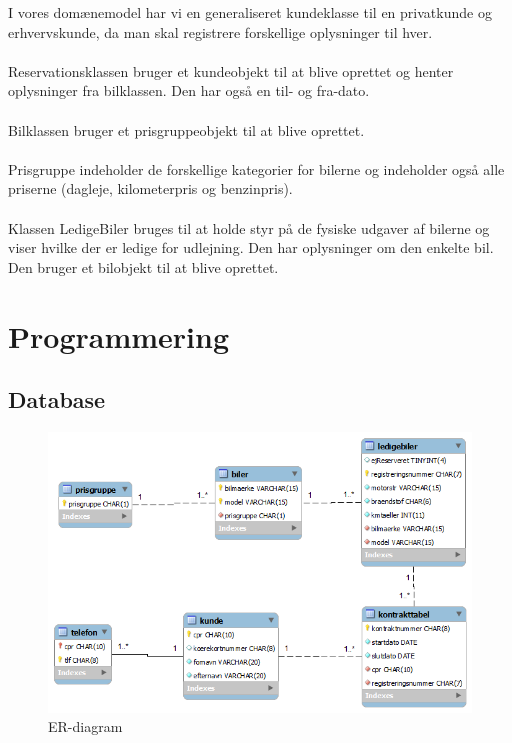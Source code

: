 \documentclass[11pt]{article}
\begin{document}
I vores domænemodel har vi en generaliseret kundeklasse til en privatkunde og erhvervskunde, da man skal registrere forskellige oplysninger til hver.\\\\
Reservationsklassen bruger et kundeobjekt til at blive oprettet og henter oplysninger fra bilklassen. Den har også en til- og fra-dato.\\\\
Bilklassen bruger et prisgruppeobjekt til at blive oprettet.\\\\
Prisgruppe indeholder de forskellige kategorier for bilerne og indeholder også alle priserne (dagleje, kilometerpris og benzinpris).\\\\
Klassen LedigeBiler bruges til at holde styr på de fysiske udgaver af bilerne og viser hvilke der er ledige for udlejning. Den har oplysninger om den enkelte bil. Den bruger et bilobjekt til at blive oprettet.

\section*{Programmering}
\subsection*{Database}
\begin{figure}
  \centering
  \includegraphics[width=15cm]{ER-diagram.png}
  \caption{ER-diagram}
  \label{fig:ER-diagram}
\end{figure}
\end{document}
